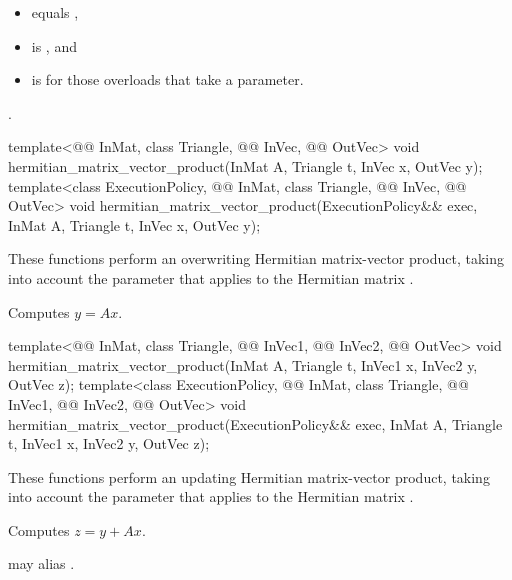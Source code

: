 \pnum
\expects
\begin{itemize}
\item
{} equals ,
\item
{} is , and
\item
{} is  for those overloads that take a  parameter.
\end{itemize}

\pnum
\complexity
{}.

%
\begin{itemdecl}
template<@@ InMat, class Triangle, @@ InVec, @@ OutVec>
  void hermitian_matrix_vector_product(InMat A, Triangle t, InVec x, OutVec y);
template<class ExecutionPolicy,
         @@ InMat, class Triangle, @@ InVec, @@ OutVec>
  void hermitian_matrix_vector_product(ExecutionPolicy&& exec,
                                       InMat A, Triangle t, InVec x, OutVec y);
\end{itemdecl}

\begin{itemdescr}
\pnum
These functions perform an overwriting Hermitian matrix-vector product,
taking into account the  parameter
that applies to the Hermitian matrix .

\pnum
\effects
Computes $y = A x$.
\end{itemdescr}

%
\begin{itemdecl}
template<@@ InMat, class Triangle, @@ InVec1, @@ InVec2, @@ OutVec>
  void hermitian_matrix_vector_product(InMat A, Triangle t, InVec1 x, InVec2 y, OutVec z);
template<class ExecutionPolicy,
         @@ InMat, class Triangle, @@ InVec1, @@ InVec2, @@ OutVec>
  void hermitian_matrix_vector_product(ExecutionPolicy&& exec,
                                       InMat A, Triangle t, InVec1 x, InVec2 y, OutVec z);
\end{itemdecl}

\begin{itemdescr}
\pnum
These functions perform an updating Hermitian matrix-vector product,
taking into account the  parameter
that applies to the Hermitian matrix .

\pnum
\effects
Computes $z = y + A x$.

\pnum
\remarks
{} may alias .
\end{itemdescr}

